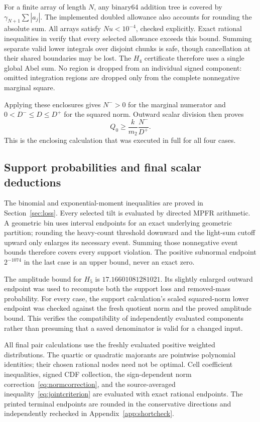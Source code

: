 \documentclass[11pt,a4paper]{article}
\theoremstyle{definition}\newtheorem{definition}[theorem]{Definition}
\theoremstyle{remark}\newtheorem{remark}[theorem]{Remark}
\numberwithin{equation}{section}
\begin{document}
For a finite array of length $N$, any binary64 addition tree is covered by $\gamma_{N+1}\sum|a_j|$. The implemented doubled allowance also accounts for rounding the absolute sum. All arrays satisfy $Nu<10^{-4}$, checked explicitly. Exact rational inequalities in  verify that every selected allowance exceeds this bound. Summing separate valid lower integrals over disjoint chunks is safe, though cancellation at their shared boundaries may be lost. The $H_4$ certificate therefore uses a single global Abel sum. No region is dropped from an individual signed component: omitted integration regions are dropped only from the complete nonnegative marginal square.

Applying these enclosures gives $N^->0$ for the marginal numerator and $0<D^-\le D\le D^+$ for the squared norm. Outward scalar division then proves
\[
 Q_0\ge\frac{k}{m_2}\frac{N^-}{D^+}.
\]
This is the enclosing calculation that was executed in full for all four cases.

\subsection{Support probabilities and final scalar deductions}
The binomial and exponential-moment inequalities are proved in Section~\ref{sec:loss}. Every selected tilt is evaluated by directed MPFR arithmetic. A geometric bin uses interval endpoints for an exact underlying geometric partition; rounding the heavy-count threshold downward and the light-sum cutoff upward only enlarges its necessary event. Summing those nonnegative event bounds therefore covers every support violation. The positive subnormal endpoint $2^{-1074}$ in the last case is an upper bound, never an exact zero.

The amplitude bound for $H_5$ is $17.16601081281021$. Its slightly enlarged outward endpoint was used to recompute both the support loss and removed-mass probability. For every case, the support calculation's scaled squared-norm lower endpoint was checked against the fresh quotient norm and the proved amplitude bound. This verifies the compatibility of independently evaluated components rather than presuming that a saved denominator is valid for a changed input.

All final pair calculations use the freshly evaluated positive weighted distributions. The quartic or quadratic majorants are pointwise polynomial identities; their chosen rational nodes need not be optimal. Cell coefficient inequalities, signed CDF collection, the sign-dependent norm correction~\eqref{eq:normcorrection}, and the source-averaged inequality~\eqref{eq:jointcriterion} are evaluated with exact rational endpoints. The printed terminal endpoints are rounded in the conservative directions and independently rechecked in Appendix~\ref{app:shortcheck}.
\end{document}
